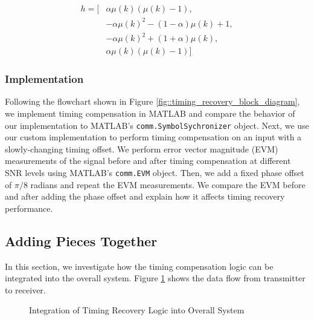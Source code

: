 \documentclass{article}
\begin{document}
\begin{equation}
\begin{split}
	h = [&\alpha\mu(k)(\mu(k) - 1), \\
	&-\alpha\mu(k)^2 - (1-\alpha)\mu(k) + 1,\\
	&-\alpha\mu(k)^2 + (1+\alpha)\mu(k),\\
	&\alpha\mu(k)(\mu(k) - 1)]
\end{split}
\end{equation}

\subsubsection{Implementation}

Following the flowchart shown in Figure \ref{fig::timing_recovery_block_diagram}, we implement timing compensation in MATLAB and compare the behavior of our implementation to MATLAB's \texttt{comm.SymbolSychronizer} object. Next, we use our custom implementation to perform timing compensation on an input with a slowly-changing timing offset. We perform error vector magnitude (EVM) measurements of the signal before and after timing compensation at different SNR levels using MATLAB's \texttt{comm.EVM} object. Then, we add a fixed phase offset of $\pi/8$ radians and repeat the EVM measurements. We compare the EVM before and after adding the phase offset and explain how it affects timing recovery performance.

\subsection{Adding Pieces Together}
\label{section::sim_procedure}

In this section, we investigate how the timing compensation logic can be integrated into the overall system.  Figure \ref{fig::timing_recovery_integration} shows the data flow from transmitter to receiver.

\begin{figure}[H]
	\centerline{}
	\caption{Integration of Timing Recovery Logic into Overall System}
	\label{fig::timing_recovery_integration}
\end{figure}
\end{document}
